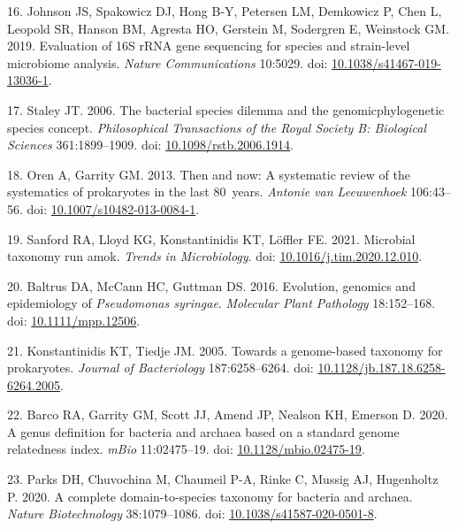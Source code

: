 \documentclass[
]{article}
\newenvironment{cslreferences}%
  {}%
  {\par}
\begin{document}
\begin{cslreferences}
\leavevmode\hypertarget{ref-Johnson2019}{}%
16. Johnson JS, Spakowicz DJ, Hong B-Y, Petersen LM, Demkowicz P, Chen
L, Leopold SR, Hanson BM, Agresta HO, Gerstein M, Sodergren E, Weinstock
GM. 2019. Evaluation of 16S rRNA gene sequencing for species and
strain-level microbiome analysis. \emph{Nature Communications} 10:5029.
doi:
\href{https://doi.org/10.1038/s41467-019-13036-1}{10.1038/s41467-019-13036-1}.

\leavevmode\hypertarget{ref-Staley2006}{}%
17. Staley JT. 2006. The bacterial species dilemma and the
genomicphylogenetic species concept. \emph{Philosophical Transactions of
the Royal Society B: Biological Sciences} 361:1899--1909. doi:
\href{https://doi.org/10.1098/rstb.2006.1914}{10.1098/rstb.2006.1914}.

\leavevmode\hypertarget{ref-Oren2013}{}%
18. Oren A, Garrity GM. 2013. Then and now: A systematic review of the
systematics of prokaryotes in the last 80~years. \emph{Antonie van
Leeuwenhoek} 106:43--56. doi:
\href{https://doi.org/10.1007/s10482-013-0084-1}{10.1007/s10482-013-0084-1}.

\leavevmode\hypertarget{ref-Sanford2021}{}%
19. Sanford RA, Lloyd KG, Konstantinidis KT, Löffler FE. 2021. Microbial
taxonomy run amok. \emph{Trends in Microbiology}. doi:
\href{https://doi.org/10.1016/j.tim.2020.12.010}{10.1016/j.tim.2020.12.010}.

\leavevmode\hypertarget{ref-Baltrus2016}{}%
20. Baltrus DA, McCann HC, Guttman DS. 2016. Evolution, genomics and
epidemiology of \emph{Pseudomonas syringae}. \emph{Molecular Plant
Pathology} 18:152--168. doi:
\href{https://doi.org/10.1111/mpp.12506}{10.1111/mpp.12506}.

\leavevmode\hypertarget{ref-Konstantinidis2005}{}%
21. Konstantinidis KT, Tiedje JM. 2005. Towards a genome-based taxonomy
for prokaryotes. \emph{Journal of Bacteriology} 187:6258--6264. doi:
\href{https://doi.org/10.1128/jb.187.18.6258-6264.2005}{10.1128/jb.187.18.6258-6264.2005}.

\leavevmode\hypertarget{ref-Barco2020}{}%
22. Barco RA, Garrity GM, Scott JJ, Amend JP, Nealson KH, Emerson D.
2020. A genus definition for bacteria and archaea based on a standard
genome relatedness index. \emph{mBio} 11:02475--19. doi:
\href{https://doi.org/10.1128/mbio.02475-19}{10.1128/mbio.02475-19}.

\leavevmode\hypertarget{ref-Parks2020}{}%
23. Parks DH, Chuvochina M, Chaumeil P-A, Rinke C, Mussig AJ, Hugenholtz
P. 2020. A complete domain-to-species taxonomy for bacteria and archaea.
\emph{Nature Biotechnology} 38:1079--1086. doi:
\href{https://doi.org/10.1038/s41587-020-0501-8}{10.1038/s41587-020-0501-8}.


\end{cslreferences}
\end{document}
